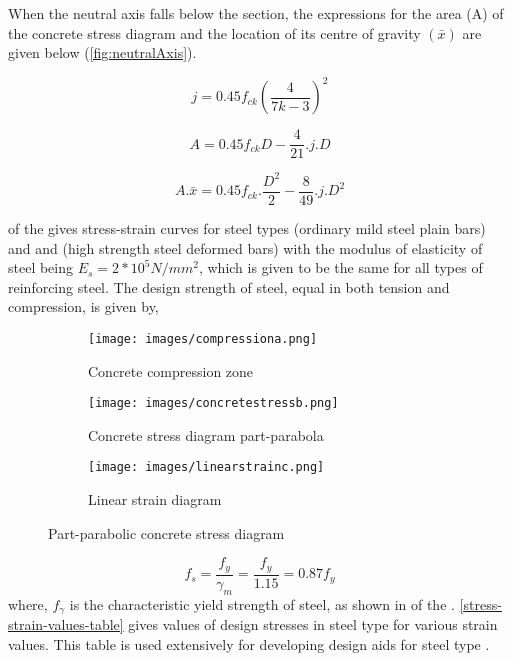 When the neutral axis falls below the section, the expressions for the
area (A) of the concrete stress diagram and the location of its centre
of gravity $(\bar x)$ are given below (\fig \ref{fig:neutralAxis}).

\begin{equation}
j=0.45f_{ck}\left(\frac{4}{7k-3}\right)^2
\end{equation}

\begin{equation}
A=0.45f_{ck}D-\frac{4}{21}.j.D
\end{equation}

\begin{equation}
A.\bar{x}=0.45f_{ck}.\frac{D^2}{2}-\frac{8}{49}.j.D^2
\end{equation}


 of the  gives stress-strain curves for
steel types  (ordinary mild steel plain bars) and {\fefouronefive} and
{\fefivezerozero} (high strength steel deformed bars) with the modulus
of elasticity of steel being $E_s = 2*10^5 N/mm^2$, which is given to be
the same for all types of reinforcing steel. The design strength of
steel, equal in both tension and compression, is given by,
\begin{figure}
\begin{subfigure}{0.3\textwidth}
\centering
\texttt{[image: images/compressiona.png]}
\caption{Concrete compression zone}
\label{fig:compression}
\end{subfigure}
%
\begin{subfigure}{0.3\textwidth}
\centering
\texttt{[image: images/concretestressb.png]}
\caption{Concrete stress diagram part-parabola}
\label{fig:stress}
\end{subfigure}
%
\begin{subfigure}{0.3\textwidth}
\centering
\texttt{[image: images/linearstrainc.png]}
\caption{Linear strain diagram}
\label{fig:strain}
\end{subfigure}
\caption{Part-parabolic concrete stress diagram}
\label{Part-ConcreteStressDiagram}
\end{figure}
\begin{equation}
f_s=\frac{f_y}{\gamma_m}=\frac{f_y}{1.15}=0.87f_y
\end{equation}
where, $f_\gamma$ is the characteristic yield strength of steel, as shown in
 of the . \tablem \ref{stress-strain-values-table}
gives values of design stresses in steel type {\fefouronefive}
for various strain values. This table is used extensively for developing
design aids for steel type {\fefouronefive}. 

